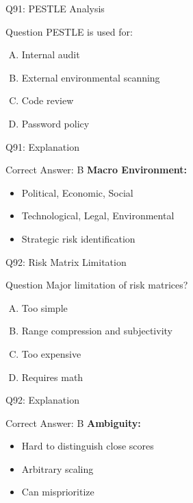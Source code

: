 \documentclass{beamer}
\begin{document}
			\begin{frame}{Q91: PESTLE Analysis}
				\begin{block}{Question}
					PESTLE is used for:
				\end{block}
				\begin{enumerate}[(A)]
					\item Internal audit
					\item External environmental scanning
					\item Code review
					\item Password policy
				\end{enumerate}
			\end{frame}
			\begin{frame}{Q91: Explanation}
				\begin{block}{Correct Answer: B}
					\textbf{Macro Environment:}
					\begin{itemize}
						\item Political, Economic, Social
						\item Technological, Legal, Environmental
						\item Strategic risk identification
					\end{itemize}
				\end{block}
			\end{frame}
			
			\begin{frame}{Q92: Risk Matrix Limitation}
				\begin{block}{Question}
					Major limitation of risk matrices?
				\end{block}
				\begin{enumerate}[(A)]
					\item Too simple
					\item Range compression and subjectivity
					\item Too expensive
					\item Requires math
				\end{enumerate}
			\end{frame}
			\begin{frame}{Q92: Explanation}
				\begin{block}{Correct Answer: B}
					\textbf{Ambiguity:}
					\begin{itemize}
						\item Hard to distinguish close scores
						\item Arbitrary scaling
						\item Can misprioritize
					\end{itemize}
				\end{block}
			\end{frame}
			
\end{document}
